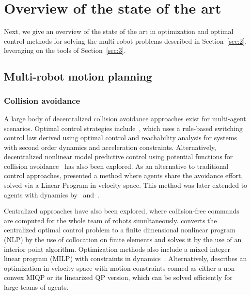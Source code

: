 
\section{Overview of the state of the art}\label{sec:4}

Next, we give an overview of the state of the art in optimization and optimal control methods for solving the multi-robot problems described in Section~\ref{sec:2}, leveraging on the tools of Section~\ref{sec:3}.

\subsection{Multi-robot motion planning}

\subsubsection{Collision avoidance}
A large body of decentralized collision avoidance approaches exist for multi-agent scenarios.
Optimal control strategies include~\cite{Hoffmann:2008vl}, which uses a rule-based switching control law derived using optimal control and reachability analysis for systems with second order dynamics and acceleration constraints.
Alternatively, decentralized nonlinear model predictive control using potential functions for collision avoidance~\cite{Shim:2003ih} has also been explored.
As an alternative to traditional control approaches, \cite{vandenberg09} presented a method where agents share the avoidance effort, solved via a Linear Program in velocity space. This method was later extended to agents with dynamics by~\cite{snape09, alonsomora10, AlonsoMora:2014kb} and~\cite{alonsomora2015auro}.

Centralized approaches have also been explored, where collision-free commands are computed for the whole team of robots simultaneously.
\cite{Raghunathan:2004ga} converts the centralized optimal control problem to a finite dimensional nonlinear program (NLP) by the use of collocation on finite elements and solves it by the use of an interior point algorithm.
Optimization methods also include a mixed integer linear program (MILP) with constraints in dynamics~\cite{Kuwata:2007vq}. Alternatively, \cite{alonsomora13icra} describes an optimization in velocity space with motion constraints conned as either a non-convex MIQP or its linearized QP version, which can be solved efficiently for large teams of agents.

